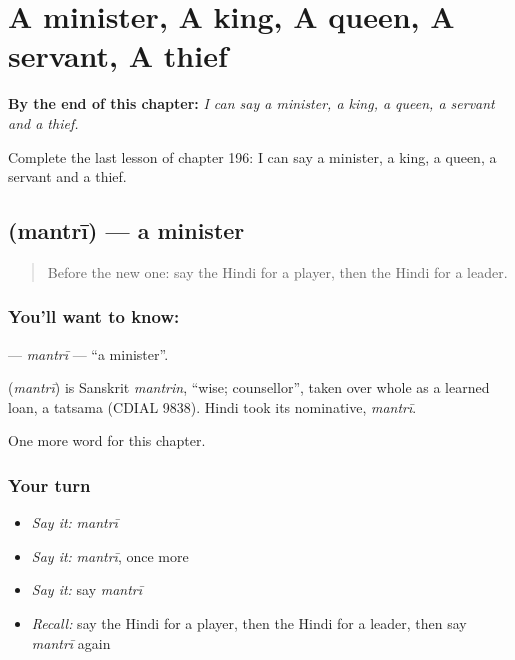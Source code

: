 
\chapter{A minister, A king, A queen, A servant, A thief}
\label{ch:hi-a-minister-a-king-a-queen-a-servant-a-thief}

\begin{chapteropening}
\textbf{By the end of this chapter:} \emph{I can say a minister, a king, a queen, a servant and a thief.}

Complete the last lesson of chapter 196: I can say a minister, a king, a queen, a servant and a thief.
\end{chapteropening}

\section[\texorpdfstring{\hi{मंत्री} (mantrī)}{मंत्री (mantrī)}]{ (mantrī) — a minister}

\label{lesson:HI-C196-mantri}



\begin{quote}
Before the new one: say the Hindi for a player, then the Hindi for a leader.
\end{quote}

\subsection*{You'll want to know: }
\textbf{} — \emph{mantrī} — \textquotedblleft{}a minister\textquotedblright{}.

\begin{cousinweb}
\textbf{} (\emph{mantrī}) is Sanskrit \emph{mantrin}, \textquotedblleft{}wise; counsellor\textquotedblright{}, taken over whole as a learned loan, a tatsama (CDIAL 9838). Hindi took its nominative, \emph{mantrī}.
\end{cousinweb}

\begin{grammarlens}[title={What you've built}]
One more word for this chapter.
\end{grammarlens}

\subsection*{Your turn}
\begin{itemize}
\raggedright
  \item \emph{Say it:} \emph{mantrī}
  \item \emph{Say it:} \emph{mantrī}, once more
  \item \emph{Say it:} say \emph{mantrī}
  \item \emph{Recall:} say the Hindi for a player, then the Hindi for a leader, then say \emph{mantrī} again
\end{itemize}

